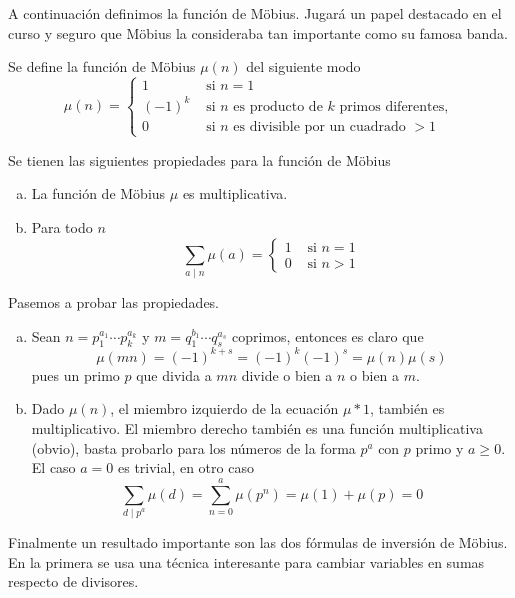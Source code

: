 \documentclass[TAN.tex]{subfiles}
\begin{document}
A continuación definimos la función de Möbius. Jugará un papel destacado en el curso y seguro que Möbius la consideraba tan importante como su famosa banda.

\begin{defi}
Se define la función de Möbius $μ(n)$ del siguiente modo
\[ μ(n) = \begin{cases}
	1 &\text{ si }n=1\\
	(-1)^k &\text{ si }n\text{ es producto de }k\text{ primos diferentes},\\
	0 &\text{ si }n\text{ es divisible por un cuadrado }>1
\end{cases}\]
\end{defi}

\begin{prop} Se tienen las siguientes propiedades para la función de Möbius
\begin{enumerate}[(a)]
\item La función de Möbius $μ$ es multiplicativa.
\item Para todo $n$
\[ \sum_{a\mid n} μ(a) = \begin{cases}
	1 & \text{ si } n = 1\\
	0 & \text{ si } n > 1
\end{cases}\]
\end{enumerate} 
\begin{dem}Pasemos a probar las propiedades.
\begin{enumerate}[(a)]
\item Sean $n=p_1^{a_1}\cdots p_k^{a_k}$ y $m=q_1^{b_1}\cdots q_s^{a_s}$ coprimos, entonces es claro que $$\mu(mn)=(-1)^{k+s}=(-1)^k(-1)^s=\mu(n)\mu(s)$$ pues un primo $p$ que divida a $mn$ divide o bien a $n$ o bien a $m$.
\item Dado $\mu(n)$, el miembro izquierdo de la ecuación $\mu \ast 1$, también es multiplicativo. El miembro derecho también es una función multiplicativa (obvio), basta probarlo para los números de la forma $p^a$ con $p$ primo y $a\geq 0$. El caso $a=0$ es trivial, en otro caso
$$
\sum_{d \mid p^a} \mu (d) = \sum_{n=0}^a \mu(p^n) = \mu(1)+\mu(p)=0
$$
\end{enumerate}
\end{dem}
\end{prop}

Finalmente un resultado importante son las dos fórmulas de inversión de Möbius.
En la primera se usa una técnica interesante para cambiar variables en sumas respecto de divisores.
\end{document}

